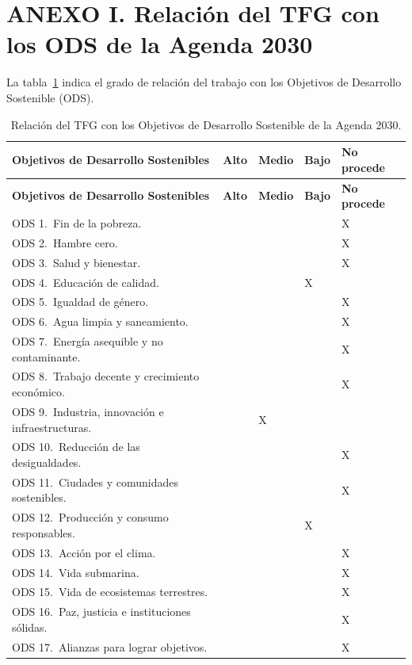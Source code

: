 
\chapter*{ANEXO I. Relación del TFG con los ODS de la Agenda 2030}

La tabla~\ref{tab:ods} indica el grado de relación del trabajo con los Objetivos de Desarrollo Sostenible (ODS).

\renewcommand{\arraystretch}{1.35}
\renewcommand{\thetable}{A.\arabic{table}}
\setcounter{table}{0}
\begin{longtable}{|p{6.7cm}|>{\centering\arraybackslash}p{1.5cm}|>{\centering\arraybackslash}p{1.5cm}|>{\centering\arraybackslash}p{1.5cm}|>{\centering\arraybackslash}p{1.8cm}|}
\caption{Relación del TFG con los Objetivos de Desarrollo Sostenible de la Agenda 2030.}\label{tab:ods}\\
\hline
\textbf{Objetivos de Desarrollo Sostenibles} & \textbf{Alto} & \textbf{Medio} & \textbf{Bajo} & \textbf{No procede} \\
\hline
\endfirsthead
\hline
\textbf{Objetivos de Desarrollo Sostenibles} & \textbf{Alto} & \textbf{Medio} & \textbf{Bajo} & \textbf{No procede} \\
\hline
\endhead
ODS 1.\ Fin de la pobreza. & & & & X \\
\hline
ODS 2.\ Hambre cero. & & & & X \\
\hline
ODS 3.\ Salud y bienestar. & & & & X \\
\hline
ODS 4.\ Educación de calidad. & & & X & \\
\hline
ODS 5.\ Igualdad de género. & & & & X \\
\hline
ODS 6.\ Agua limpia y saneamiento. & & & & X \\
\hline
ODS 7.\ Energía asequible y no contaminante. & & & & X \\
\hline
ODS 8.\ Trabajo decente y crecimiento económico. & & & & X \\
\hline
ODS 9.\ Industria, innovación e infraestructuras. & & X & & \\
\hline
ODS 10.\ Reducción de las desigualdades. & & & & X \\
\hline
ODS 11.\ Ciudades y comunidades sostenibles. & & & & X \\
\hline
ODS 12.\ Producción y consumo responsables. & & & X & \\
\hline
ODS 13.\ Acción por el clima. & & & & X \\
\hline
ODS 14.\ Vida submarina. & & & & X \\
\hline
ODS 15.\ Vida de ecosistemas terrestres. & & & & X \\
\hline
ODS 16.\ Paz, justicia e instituciones sólidas. & & & & X \\
\hline
ODS 17.\ Alianzas para lograr objetivos. & & & & X \\
\hline
\end{longtable}


